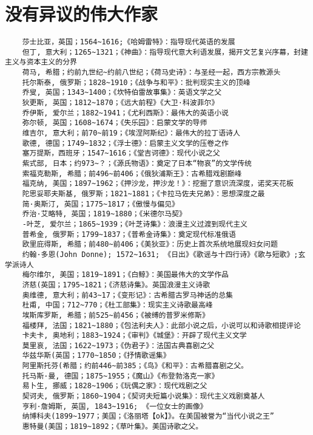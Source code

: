 \documentclass[UTF8]{../../RepresentationUniverse}
\begin{document}
\section{没有异议的伟大作家}
\begin{lstlisting}
    莎士比亚，英国；1564~1616;《哈姆雷特》：指导现代英语的发展
    但丁, 意大利；1265~1321；《神曲》：指导现代意大利语发展，揭开文艺复兴序幕，封建主义与资本主义的分界
    荷马, 希腊；约前九世纪~约前八世纪；《荷马史诗》：与圣经一起，西方宗教源头
    托尔斯泰, 俄罗斯；1828~1910；《战争与和平》：批判现实主义的顶峰
    乔叟, 英国；1343~1400；《坎特伯雷故事集》：英语文学之父
    狄更斯, 英国；1812~1870；《远大前程》《大卫·科波菲尔》
    乔伊斯, 爱尔兰；1882~1941；《尤利西斯》：最伟大的英语小说
    弥尔顿, 英国；1608~1674；《失乐园》：启蒙文学的导师
    维吉尔, 意大利；前70~前19；《埃涅阿斯纪》：最伟大的拉丁语诗人
    歌德, 德国；1749~1832；《浮士德》：启蒙主义文学的压卷之作
    塞万提斯，西班牙；1547~1616；《堂吉诃德》：现代小说之父
    紫式部, 日本；约973~？；《源氏物语》：奠定了日本“物哀”的文学传统
    索福克勒斯, 希腊；前496~前406；《俄狄浦斯王》：古希腊戏剧巅峰
    福克纳, 美国；1897~1962；《押沙龙，押沙龙！》：挖掘了意识流深度，诺奖天花板
    陀思妥耶夫斯基, 俄罗斯；1821~1881；《卡拉马佐夫兄弟》：思想深度之最
    简·奥斯汀, 英国；1775~1817；《傲慢与偏见》
    乔治·艾略特, 英国；1819~1880；《米德尔马契》
    -叶芝, 爱尔兰；1865~1939；《叶芝诗集》：浪漫主义过渡到现代主义
    普希金, 俄罗斯；1799~1837；《普希金诗集》：奠定现代标准俄语
    欧里庇得斯, 希腊；前480~前406；《美狄亚》：历史上首次系统地展现妇女问题
    约翰·多恩(John Donne); 1572~1631; 《日出》《歌谣与十四行诗》《歌与短歌》;玄学派诗人
    梅尔维尔, 美国；1819~1891；《白鲸》：美国最伟大的文学作品
    济慈(英国；1795~1821；《济慈诗集》。英国浪漫主义诗歌
    奥维德, 意大利；前43~17；《变形记》：古希腊古罗马神话的总集
    杜甫, 中国；712~770；《杜工部集》：现实主义诗歌最高峰
    埃斯库罗斯, 希腊；前525~前456；《被缚的普罗米修斯》
    福楼拜, 法国；1821~1880；《包法利夫人》：此部小说之后，小说可以和诗歌相提评论
    卡夫卡, 奥地利；1883~1924；《审判》《城堡》：开辟了现代主义文学
    莫里哀, 法国；1622~1973；《伪君子》：法国古典喜剧之父
    华兹华斯(英国；1770~1850；《抒情歌谣集》
    阿里斯托芬(希腊；约前446~前385；《鸟》《和平》：古希腊喜剧之父。
    托马斯·曼, 德国；1875~1955；《魔山》《布登勃洛克一家》
    易卜生, 挪威；1828~1906；《玩偶之家》：现代戏剧之父
    契诃夫, 俄罗斯；1860~1904；《契诃夫短篇小说集》：现代主义戏剧奠基人
    亨利·詹姆斯, 英国, 1843~1916; 《一位女士的画像》
    纳博科夫(1899~1977；美国；《洛丽塔【ok】》。在美国被誉为“当代小说之王”
    惠特曼(美国；1819~1892；《草叶集》。美国诗歌之父。

\end{lstlisting}
\end{document}
